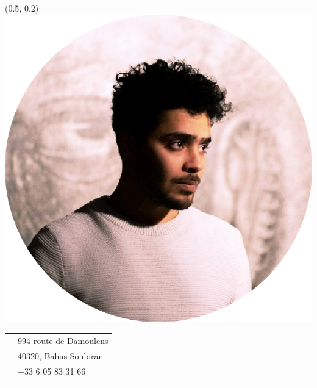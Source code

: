 \documentclass[]{friggeri-cv}
\begin{document}
\begin{textblock}{6}(0.5, 0.2)
\includegraphics[scale=0.18]{img/mdellabani}


  \begin{tabular}{c p{5cm}}
    \raisebox{-6pt}{\Large{\textifsymbol{18} $\quad$}} &  \small{ 994 route de Damoulens} \\ %
    \vspace*{2mm}
    \raisebox{-4pt}{} & \small{40320, Bahus-Soubiran} \\ %
    \raisebox{-1pt}{\hspace{-1mm}\Large{\faMobile}$\quad$} & \small{+33 6 05 83 31 66} \\ %
    \vspace*{0.5mm}
  \end{tabular}
  \newline
  \hspace*{10mm}\href{mailto:mahieddine.dellabani@gmail.com}{\Large{\textcolor{yt}{\faAt}}$\quad$}  \href{https://www.linkedin.com/in/mdellabani}{{\Large{\textcolor{linkedin}\faLinkedinSquare}$\quad$}} \href{https://github.com/mdellabani}{\Large{\textcolor{black}\faGithub}}
  

\end{textblock}
\end{document}
